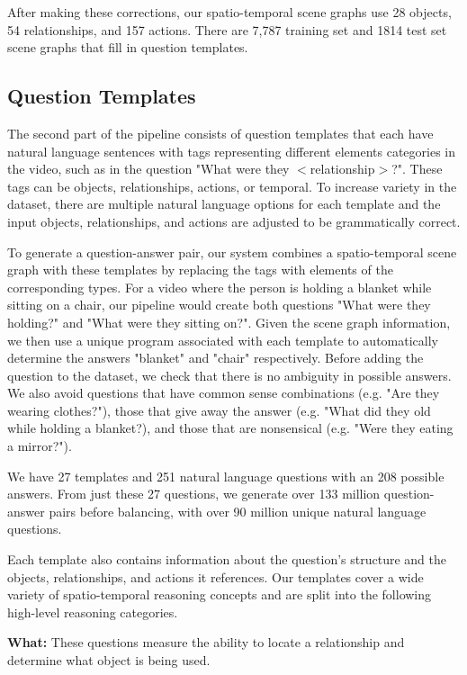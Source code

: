 After making these corrections, our spatio-temporal scene graphs use 28 objects, 54 relationships, and 157 actions. There are 7,787 training set and 1814 test set scene graphs that fill in question templates.

\subsection{Question Templates}

The second part of the pipeline consists of question templates that each have natural language sentences with tags representing different elements categories in the video, such as in the question "What were they $<$relationship$>$?". These tags can be objects, relationships, actions, or temporal. To increase variety in the dataset, there are multiple natural language options for each template and the input objects, relationships, and actions are adjusted to be grammatically correct.


To generate a question-answer pair, our system combines a spatio-temporal scene graph with these templates by replacing the tags with elements of the corresponding types. For a video where the person is holding a blanket while sitting on a chair, our pipeline would create both questions "What were they holding?" and "What were they sitting on?". Given the scene graph information, we then use a unique program associated with each template to automatically determine the answers "blanket" and "chair" respectively. 
Before adding the question to the dataset, we check that there is no ambiguity in possible answers. We also avoid questions that have common sense combinations (e.g. "Are they wearing clothes?"), those that give away the answer (e.g. "What did they old while holding a blanket?), and those that are nonsensical (e.g. "Were they eating a mirror?").

We have 27 templates and 251 natural language questions with an 208 possible answers. From just these 27 questions, we generate over 133 million question-answer pairs before balancing, with over 90 million unique natural language questions.

Each template also contains information about the question's structure and the objects, relationships, and actions it references. Our templates cover a wide variety of spatio-temporal reasoning concepts and are split into the following high-level reasoning categories. 

\textbf{What: } These questions measure the ability to locate a relationship and determine what object is being used.

